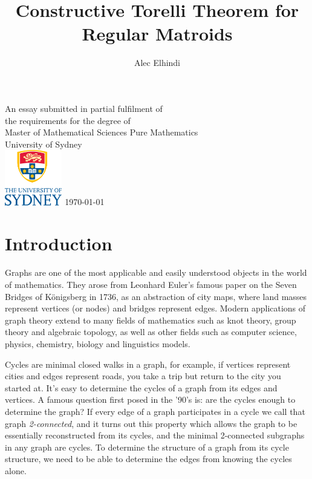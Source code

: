 \documentclass[12pt]{report}
\theoremstyle{definition}
\theoremstyle{upright}
\begin{document}
	

\author{Alec Elhindi}
\title{Constructive Torelli Theorem for Regular Matroids}

\cleardoublepage \thispagestyle{empty}
\null \vfil
\begingroup
\LARGE \bfseries \centering
\openup \medskipamount
\thetitle \par \vspace{30pt}
\centering \mdseries \theauthor \par \bigskip
\endgroup
\vfil \vfil \vfil
\begin{center}
    An essay submitted in partial fulfilment of\\
    the requirements for the degree of\\
    Master of Mathematical Sciences
    \vfil\vfil
    {\large Pure Mathematics\\[5pt]
	University of Sydney}\\
    \vskip6mm
    \includegraphics[width=25mm]{images/USY_MB1_CMYK_Stacked_Logo}
    \vfil
    \normalsize\today
\end{center}
\vfil
\cleardoublepage

\tableofcontents

\newpage

\chapter*{Introduction}

    Graphs are one of the most applicable and easily understood objects in the world of mathematics.
    They arose from Leonhard Euler's famous paper on the Seven Bridges of K\"{o}nigsberg in 1736, as an abstraction of city maps, where land masses represent vertices (or nodes) and bridges represent edges. 
    Modern applications of graph theory extend to many fields of mathematics such as knot theory, group theory and algebraic topology, as well as other fields such as computer science, physics, chemistry, biology and linguistics models.

    Cycles are minimal closed walks in a graph, for example, if vertices represent cities and edges represent roads, you take a trip but return to the city you started at. 
    It's easy to determine the cycles of a graph from its edges and vertices.
    A famous question first posed in the '90's is: are the cycles enough to determine the graph?
    If every edge of a graph participates in a cycle we call that graph \textit{2-connected}, and it turns out this property which allows the graph to be essentially reconstructed from its cycles, and the minimal 2-connected subgraphs in any graph are cycles.
    To determine the structure of a graph from its cycle structure, we need to be able to determine the edges from knowing the cycles alone.
\end{document}

